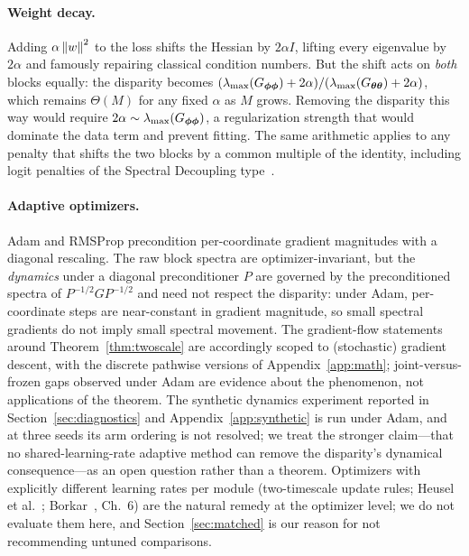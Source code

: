 \paragraph{Weight decay.}
Adding $\alpha \left\lVert w\right\rVert^2$ to the loss shifts the Hessian by $2\alpha I$,
lifting every eigenvalue by $2\alpha$ and famously repairing classical
condition numbers. But the shift acts on \emph{both} blocks equally: the
disparity becomes $(\lambda_{\max}(G_{{\boldsymbol{\phi}}{\boldsymbol{\phi}}}) + 2\alpha) /
(\lambda_{\max}(G_{{\boldsymbol{\theta}}{\boldsymbol{\theta}}}) + 2\alpha)$, which remains $\Theta(M)$
for any fixed $\alpha$ as $M$ grows. Removing the disparity this way would
require $2\alpha \sim \lambda_{\max}(G_{{\boldsymbol{\phi}}{\boldsymbol{\phi}}})$, a regularization
strength that would dominate the data term and prevent fitting. The same
arithmetic applies to any penalty that shifts the two blocks by a common
multiple of the identity, including logit penalties of the Spectral
Decoupling type~\citep{pezeshki2021gradient}.

\paragraph{Adaptive optimizers.}
Adam and RMSProp precondition per-coordinate gradient magnitudes with a
diagonal rescaling. The raw block spectra are optimizer-invariant, but the
\emph{dynamics} under a diagonal preconditioner $P$ are governed by the
preconditioned spectra of $P^{-1/2} G P^{-1/2}$ and need not respect the
disparity: under Adam, per-coordinate steps are near-constant in gradient
magnitude, so small spectral gradients do not imply small spectral movement.
The gradient-flow statements around Theorem~\ref{thm:twoscale} are
accordingly scoped to (stochastic) gradient descent, with the discrete
pathwise versions of Appendix~\ref{app:math}; joint-versus-frozen gaps
observed under Adam are evidence about the phenomenon, not applications of
the theorem. The synthetic dynamics experiment reported in
Section~\ref{sec:diagnostics} and Appendix~\ref{app:synthetic} is run under
Adam, and at three seeds its arm ordering is not resolved; we treat the
stronger claim---that no shared-learning-rate adaptive method can remove the
disparity's dynamical consequence---as an open question rather than a
theorem. Optimizers with explicitly different learning rates per module
(two-timescale update rules; Heusel et al.~\citep{heusel2017gans};
Borkar~\citep{borkar2008stochastic}, Ch.~6) are the natural remedy at the
optimizer level; we do not evaluate them here, and
Section~\ref{sec:matched} is our reason for not recommending untuned
comparisons.

